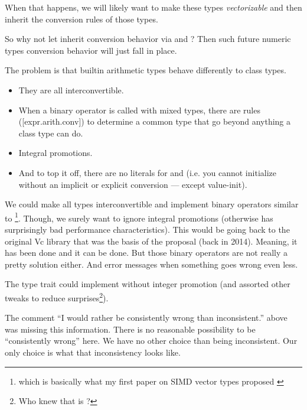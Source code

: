 When that happens, we will likely want to make these types \emph{vectorizable}
and then inherit the conversion rules of those types.

So why not let  inherit conversion behavior via
\std{} and \std{}?
Then such future numeric types conversion behavior will just fall in place.

The problem is that builtin arithmetic types behave differently to class types.
\begin{itemize}
  \item They are all interconvertible.
  \item When a binary operator is called with mixed types, there are rules
    ([expr.arith.conv]) to determine a common type that go beyond anything a
    class type can do.
  \item Integral promotions.
  \item And to top it off, there are no literals for  and
     (i.e. you cannot initialize without an implicit or
    explicit conversion --- except value-init).
\end{itemize}

We could make all  types interconvertible and implement binary
operators similar to \footnote{which is basically what my first paper on SIMD vector types
proposed \cite{N4184}}.
Though, we surely want to ignore integral promotions (otherwise
 has surprisingly bad performance
characteristics).
This would be going back to the original Vc library that was the basis of the
 proposal (back in 2014).
Meaning, it has been done and it can be done.
But those binary operators are not really a pretty solution either.
And error messages when something goes wrong even less.

The type trait  could implement
 without integer promotion (and assorted other tweaks to
reduce surprises\footnote{Who knew that
 is
?}).

The comment ``I would rather be consistently wrong than inconsistent.'' above
was missing this information.
There is no reasonable possibility to be ``consistently wrong'' here.
We have no other choice than being inconsistent.
Our only choice is what that inconsistency looks like.

